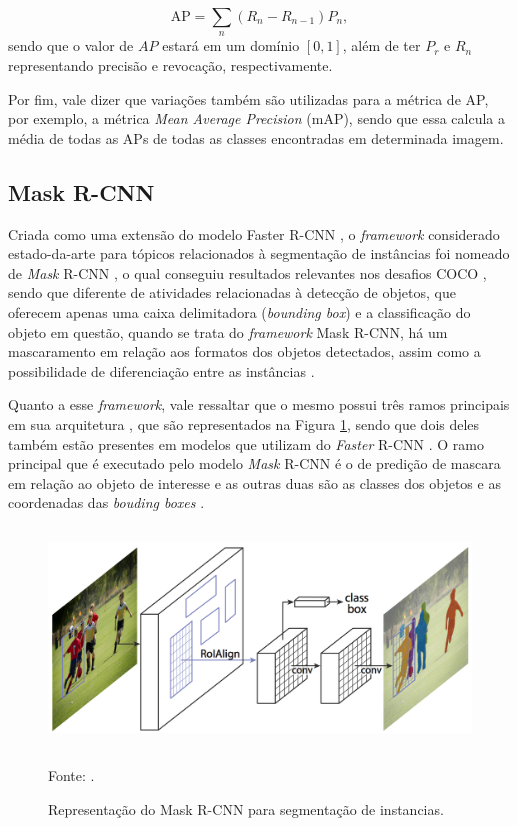 \begin{equation}
    \label{instance:eq:1}
    \text{AP} = \sum_n (R_n - R_{n-1}) P_n,
\end{equation}
sendo que o valor de $AP$ estará em um domínio $[0,1]$, além de ter $P_r$ e $R_n$ representando precisão e revocação, respectivamente.

Por fim, vale dizer que variações também são utilizadas para a métrica de AP, por exemplo, a métrica \textit{Mean Average Precision} (mAP), sendo que essa calcula a média de todas as APs de todas as classes encontradas em determinada imagem.


\subsection{Mask R-CNN}
\label{instance:mask}

Criada como uma extensão do modelo Faster R-CNN \cite{Ren2017}, o \textit{framework} considerado estado-da-arte para tópicos relacionados à segmentação de instâncias foi nomeado de \textit{Mask} R-CNN \cite{He2020}, o qual conseguiu resultados relevantes nos desafios COCO \cite{Lin2016}, sendo que diferente de atividades relacionadas à detecção de objetos, que oferecem apenas uma caixa delimitadora (\textit{bounding box}) e a classificação do objeto em questão, quando se trata do \textit{framework} Mask R-CNN, há um mascaramento em relação aos formatos dos objetos detectados, assim como a possibilidade de diferenciação entre as instâncias \cite{Hafiz2020}.

Quanto a esse \textit{framework}, vale ressaltar que o mesmo possui três ramos principais em sua arquitetura \cite{He2020, Minaee2021}, que são representados na Figura \ref{instance:fig:2}, sendo que dois deles também estão presentes em modelos que utilizam do \textit{Faster} R-CNN \cite{Ren2017}. O ramo principal que é executado pelo modelo \textit{Mask} R-CNN é o de predição de mascara em relação ao objeto de interesse e as outras duas são as classes dos objetos e as coordenadas das \textit{bouding boxes} \cite{Minaee2021}.

\begin{figure}[H]
    \centering
    \caption{Representação do Mask R-CNN para segmentação de instancias.}
    \includegraphics[height=2.3in]{recursos/imagens/instance/Mask-R-CNN_examp.png}
    \label{instance:fig:2}

    \vspace*{1 cm}
    Fonte: \cite{He2020}.
\end{figure}

